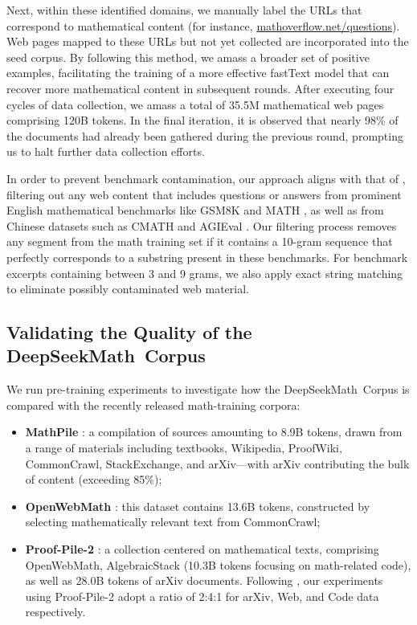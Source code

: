 \begin{itemize}[topsep=0pt]
Next, within these identified domains, we manually label the URLs that correspond to mathematical content (for instance, \url{mathoverflow.net/questions}). Web pages mapped to these URLs but not yet collected are incorporated into the seed corpus. By following this method, we amass a broader set of positive examples, facilitating the training of a more effective fastText model that can recover more mathematical content in subsequent rounds. After executing four cycles of data collection, we amass a total of 35.5M mathematical web pages comprising 120B tokens. In the final iteration, it is observed that nearly 98\% of the documents had already been gathered during the previous round, prompting us to halt further data collection efforts.

In order to prevent benchmark contamination, our approach aligns with that of \cite{deepseek-coder}, filtering out any web content that includes questions or answers from prominent English mathematical benchmarks like GSM8K \citep{gsm8k} and MATH \citep{MATH}, as well as from Chinese datasets such as CMATH \citep{wei2023cmath} and AGIEval \citep{agieval}. Our filtering process removes any segment from the math training set if it contains a 10-gram sequence that perfectly corresponds to a substring present in these benchmarks. For benchmark excerpts containing between 3 and 9 grams, we also apply exact string matching to eliminate possibly contaminated web material.

\subsection{Validating the Quality of the DeepSeekMath~Corpus}

We run pre-training experiments to investigate how the DeepSeekMath~Corpus is compared with the recently released math-training corpora:

\begin{itemize}[topsep=0pt]
    \item \textbf{MathPile} \citep{mathpile}: a compilation of sources amounting to 8.9B tokens, drawn from a range of materials including textbooks, Wikipedia, ProofWiki, CommonCrawl, StackExchange, and arXiv—with arXiv contributing the bulk of content (exceeding 85\%);
    \item \textbf{OpenWebMath} \citep{openwebmath}: this dataset contains 13.6B tokens, constructed by selecting mathematically relevant text from CommonCrawl;
    \item \textbf{Proof-Pile-2} \citep{llemma}: a collection centered on mathematical texts, comprising OpenWebMath, AlgebraicStack (10.3B tokens focusing on math-related code), as well as 28.0B tokens of arXiv documents. Following \cite{llemma}, our experiments using Proof-Pile-2 adopt a ratio of 2:4:1 for arXiv, Web, and Code data respectively.
\end{itemize}


\end{itemize}
